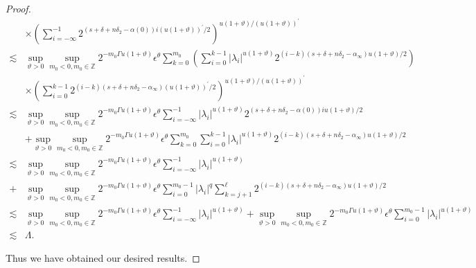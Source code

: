 \documentclass[10pt,a4paper]{amsart}
\begin{document}
\begin{proof}
\begin{align*}
 &\times\left(\sum_{i=-\infty}^{-1} 2^{\left(s+\delta+n \delta_{2}-\alpha(0)\right) i( u(1+\vartheta))^{\prime} / 2}\right)^{u(1+\vartheta) / (u(1+\vartheta))^{\prime}} \\
\lesssim & \sup_{\vartheta>0 }\sup _{m_0<0, m_0\in  \mathbb{Z}} 2^{-m_0\Gamma u(1+\vartheta)} \epsilon  ^\theta \sum_{k=0}^{m_0}\left(\sum_{i=0}^{k-1}\left|\lambda_{i}\right|^{u(1+\vartheta)} 2^{(i-k)\left(s+\delta+n \delta_{2}-\alpha_{\infty}\right) u(1+\vartheta) / 2}\right) \\
& \times\left(\sum_{i=0}^{k-1} 2^{(i-k)\left(s+\delta+n \delta_{2}-\alpha_{\infty}\right) (u(1+\vartheta))^{\prime} / 2}\right)^{u(1+\vartheta) / (u(1+\vartheta))^{\prime}}\\
\lesssim & \sup_{\vartheta>0 }\sup _{m_0<0, m_0\in  \mathbb{Z}} 2^{-m_0\Gamma u(1+\vartheta)} \epsilon  ^\theta \sum_{i=-\infty}^{-1}\left|\lambda_{i}\right|^{u(1+\vartheta)} 2^{\left(s+\delta+n \delta_{2}-\alpha(0)\right) iu (1+\vartheta) / 2} \\
& +\sup_{\vartheta>0 }\sup _{m_0<0, m_0\in  \mathbb{Z}} 2^{-m_0\Gamma u(1+\vartheta)} \epsilon  ^\theta \sum_{k=0}^{m_0} \sum_{i=0}^{k-1}\left|\lambda_{i}\right|^{u(1+\vartheta)} 2^{(i-k)\left(s+\delta+n \delta_{2}-\alpha_{\infty}\right) u(1+\vartheta) / 2} \\
\lesssim & \sup_{\vartheta>0 }\sup _{m_0<0, m_0\in  \mathbb{Z}} 2^{-m_0\Gamma u(1+\vartheta)} \epsilon  ^\theta \sum_{i=-\infty}^{-1}\left|\lambda_{i}\right|^{u(1+\vartheta)} \\
+& \sup_{\vartheta>0 }\sup _{m_0<0, m_0\in  \mathbb{Z}} 2^{-m_0\Gamma u(1+\vartheta)} \epsilon  ^\theta \sum_{i=0}^{m_0-1}\left|\lambda_{i}\right|^{q} \sum_{k=j+1}^{\ell } 2^{(i-k)\left(s+\delta+n \delta_{2}-\alpha_{\infty}\right) u(1+\vartheta) / 2} \\
\lesssim & \sup_{\vartheta>0 }\sup _{m_0<0, m_0\in  \mathbb{Z}} 2^{-m_0\Gamma u(1+\vartheta)} \epsilon  ^\theta \sum_{i=-\infty}^{-1}\left|\lambda_{i}\right|^{u(1+\vartheta)}+\sup_{\vartheta>0 }\sup _{m_0<0, m_0\in  \mathbb{Z}} 2^{-m_0\Gamma u(1+\vartheta)} \epsilon  ^\theta \sum_{i=0}^{m_0-1}\left|\lambda_{i}\right|^{u(1+\vartheta)}\\
\lesssim & \Lambda .
\end{align*}





Thus we have obtained our desired results. 
\end{proof}
\end{document}
